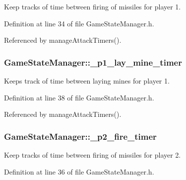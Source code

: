 Keep tracks of time between firing of missiles for player 1. 



Definition at line 34 of file Game\-State\-Manager.\-h.



Referenced by manage\-Attack\-Timers().

\hypertarget{classGameStateManager_a7e424def0f4a2f1548b5b63629cd66f1}{
\subsubsection[{\-\_\-p1\-\_\-lay\-\_\-mine\-\_\-timer}]{ Game\-State\-Manager\-::\-\_\-p1\-\_\-lay\-\_\-mine\-\_\-timer\hspace{0.3cm}{\ttfamily [private]}}}\label{classGameStateManager_a7e424def0f4a2f1548b5b63629cd66f1}


Keeps track of time between laying mines for player 1. 



Definition at line 38 of file Game\-State\-Manager.\-h.



Referenced by manage\-Attack\-Timers().

\hypertarget{classGameStateManager_a6ffa94597eef770ae4c812a834daa39c}{
\subsubsection[{\-\_\-p2\-\_\-fire\-\_\-timer}]{ Game\-State\-Manager\-::\-\_\-p2\-\_\-fire\-\_\-timer\hspace{0.3cm}{\ttfamily [private]}}}\label{classGameStateManager_a6ffa94597eef770ae4c812a834daa39c}


Keep tracks of time between firing of missiles for player 2. 



Definition at line 36 of file Game\-State\-Manager.\-h.



